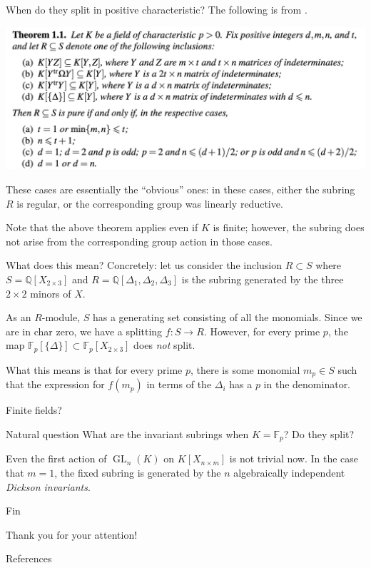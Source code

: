 \documentclass{beamer}
\DeclareMathOperator{\GL}{GL}
\newenvironment{blurb}
{\par\tiny}
{\par\addvspace{\bigskipamount}}
\begin{document}
	\begin{frame}{When do they split in positive characteristic?}
		The following is from \cite{HochsterJeffriesPandeySingh}. \pause

		\includegraphics[width=\textwidth]{figs/HJPS_main_theorem.png}

		These cases are essentially the ``obvious'' ones: in these cases, either the subring $R$ is regular, or the corresponding group was linearly reductive. \pause 
		\begin{blurb}
			Note that the above theorem applies even if $K$ is finite; however, the subring does not arise from the corresponding group action in those cases.
		\end{blurb}
	\end{frame}

	\begin{frame}{What does this mean?}
		Concretely: let us consider the inclusion $R \subset S$ where $S = \mathbb{Q}[X_{2 \times 3}]$ and $R = \mathbb{Q}[\Delta_{1}, \Delta_{2}, \Delta_{3}]$ is the subring generated by the three $2 \times 2$ minors of $X$. \pause

		As an $R$-module, $S$ has a generating set consisting of all the monomials. \pause Since we are in char zero, we have a splitting $f : S \to R$. \pause However, for every prime $p$, the map $\mathbb{F}_{p}[\{\Delta\}] \subset \mathbb{F}_{p}[X_{2 \times 3}]$ does \emph{not} split. 

		\pause What this means is that for every prime $p$, there is some monomial $m_{p} \in S$ such that the expression for $f(m_{p})$ in terms of the $\Delta_{i}$ has a $p$ in the denominator.
	\end{frame}

	\begin{frame}{Finite fields?}
		\begin{block}{Natural question}
			What are the invariant subrings when $K = \mathbb{F}_{p}$? Do they split?
		\end{block}
		Even the first action of $\GL_{n}(K)$ on $K[X_{n \times m}]$ is not trivial now. \pause In the case that $m = 1$, the fixed subring is generated by the $n$ algebraically independent \emph{Dickson invariants}. 
	\end{frame}

	\begin{frame}{Fin}

		\vfill 

		Thank you for your attention!

		\vfill
	\end{frame}

	\begin{frame}{References}
		\printbibliography
	\end{frame}
\end{document}
